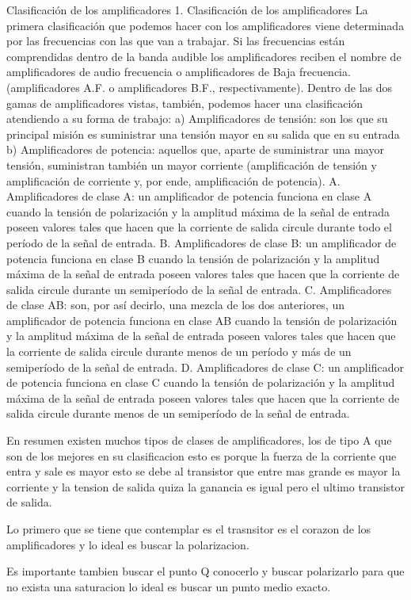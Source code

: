 \documentclass[10pt,a4paper]{article}
\begin{document}
Clasificación de los amplificadores
1. Clasificación de los amplificadores
La primera clasificación que podemos hacer con los amplificadores viene determinada por las frecuencias con las que van a trabajar. Si las frecuencias están comprendidas dentro de la banda audible los amplificadores reciben el nombre de amplificadores de audio frecuencia o amplificadores de Baja frecuencia. (amplificadores A.F. o amplificadores B.F., respectivamente).
Dentro de las dos gamas de amplificadores vistas, también, podemos hacer una clasificación atendiendo a su forma de trabajo:
a) Amplificadores de tensión: son los que su principal misión es suministrar una tensión mayor en su salida que en su entrada
b) Amplificadores de potencia: aquellos que, aparte de suministrar una mayor tensión, suministran también un mayor corriente (amplificación de tensión y amplificación de corriente y, por ende, amplificación de potencia).
A. Amplificadores de clase A: un amplificador de potencia funciona en clase A cuando la tensión de polarización y la amplitud máxima de la señal de entrada poseen valores tales que hacen que la corriente de salida circule durante todo el período de la señal de entrada.
B. Amplificadores de clase B: un amplificador de potencia funciona en clase B cuando la tensión de polarización y la amplitud máxima de la señal de entrada poseen valores tales que hacen que la corriente de salida circule durante un semiperíodo de la señal de entrada.
C. Amplificadores de clase AB: son, por así decirlo, una mezcla de los dos anteriores, un amplificador de potencia funciona en clase AB cuando la tensión de polarización y la amplitud máxima de la señal de entrada poseen valores tales que hacen que la corriente de salida circule durante menos de un período y más de un semiperíodo de la señal de entrada.
D. Amplificadores de clase C: un amplificador de potencia funciona en clase C cuando la tensión de polarización y la amplitud máxima de la señal de entrada poseen valores tales que hacen que la corriente de salida circule durante menos de un semiperíodo de la señal de entrada.

En resumen existen muchos tipos de clases de amplificadores, los de tipo A que son de los mejores en su clasificacion esto es porque la fuerza de la corriente que entra y sale es mayor esto se debe al transistor que entre mas grande es mayor la corriente y la tension de salida quiza la ganancia es igual pero el ultimo transistor de salida.

Lo primero que se tiene que contemplar es el trasnsitor es el corazon de los amplificadores y lo ideal es buscar la polarizacion.

Es importante tambien buscar el punto Q conocerlo y buscar polarizarlo para que no exista una saturacion lo ideal es buscar un punto medio exacto.
\end{document}
